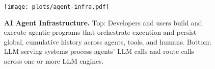 \begin{figure}[t]
    \centering
    \texttt{[image: plots/agent-infra.pdf]}
    \caption{\small\textbf{AI Agent Infrastructure.} Top: Developers and users build and execute agentic programs that orchestrate execution and persist global, cumulative history across agents, tools, and humans. Bottom: LLM serving systems process agents' LLM calls and route calls across one or more LLM engines.}
    \label{fig:agent_infra}
     \vspace{-6mm}
 \end{figure}